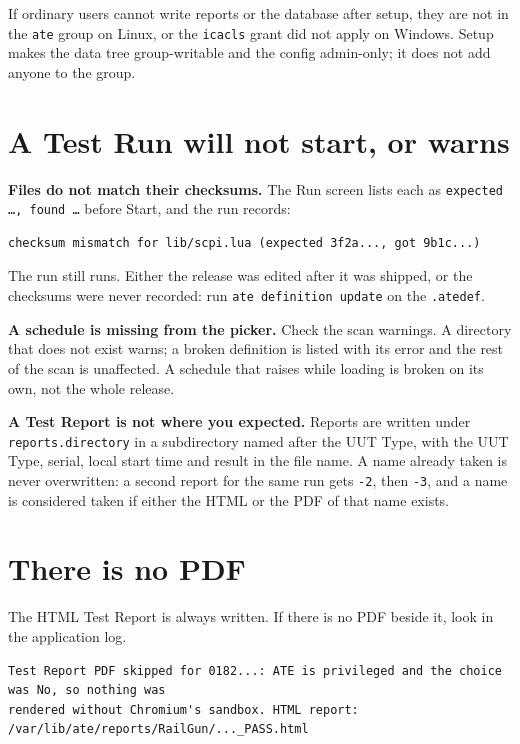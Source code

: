 If ordinary users cannot write reports or the database after setup, they are not in the \texttt{ate}
group on Linux, or the \texttt{icacls} grant did not apply on Windows. Setup makes the data tree
group-writable and the config admin-only; it does not add anyone to the group.

\section{A Test Run will not start, or warns}

\textbf{Files do not match their checksums.} The Run screen lists each as \texttt{expected \dots,
found \dots} before Start, and the run records:

\begin{lstlisting}[language=ATEShell]
checksum mismatch for lib/scpi.lua (expected 3f2a..., got 9b1c...)
\end{lstlisting}

The run still runs. Either the release was edited after it was shipped, or the checksums were never
recorded: run \texttt{ate definition update} on the \texttt{.atedef}.

\textbf{A schedule is missing from the picker.} Check the scan warnings. A directory that does not
exist warns; a broken definition is listed with its error and the rest of the scan is unaffected. A
schedule that raises while loading is broken on its own, not the whole release.

\textbf{A Test Report is not where you expected.} Reports are written under \texttt{reports.directory}
in a subdirectory named after the UUT Type, with the UUT Type, serial, local start time and result in
the file name. A name already taken is never overwritten: a second report for the same run gets
\texttt{-2}, then \texttt{-3}, and a name is considered taken if either the HTML or the PDF of that
name exists.

\section{There is no PDF}

The HTML Test Report is always written. If there is no PDF beside it, look in the application log.

\begin{lstlisting}[language=ATEShell]
Test Report PDF skipped for 0182...: ATE is privileged and the choice was No, so nothing was
rendered without Chromium's sandbox. HTML report: /var/lib/ate/reports/RailGun/..._PASS.html
\end{lstlisting}


